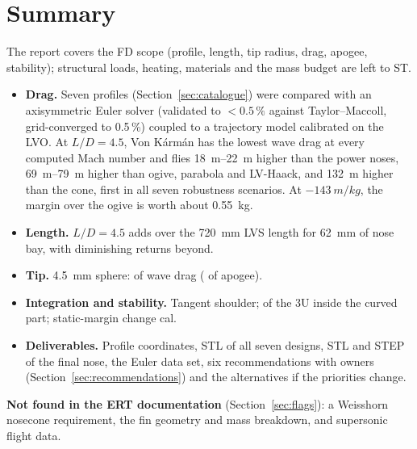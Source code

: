 \section*{Summary}

\noindent{}

\vspace{6pt}
\noindent The report covers the FD scope (profile, length, tip radius, drag, apogee, stability);
structural loads, heating, materials and the mass budget are left to ST.

\begin{itemize}[leftmargin=*,itemsep=2pt]
\item \textbf{Drag.} Seven profiles (Section~\ref{sec:catalogue}) were compared with an axisymmetric
Euler solver (validated to $<0.5\,\%$ against Taylor--Maccoll, grid-converged to 0.5\,\%) coupled to a
trajectory model calibrated on the LVO. At $L/D = 4.5$, Von K\'arm\'an has the lowest wave drag at every
computed Mach number and flies \SIrange{18}{22}{m} higher than the power noses, \SIrange{69}{79}{m}
higher than ogive, parabola and LV-Haack, and \SI{132}{m} higher than the cone, first in all seven
robustness scenarios. At $-\SI{143}{m/kg}$, the margin over the ogive is worth about \SI{0.55}{kg}.
\item \textbf{Length.} $L/D = 4.5$ adds \TRADELEN{} over the \SI{720}{mm} LVS length for \SI{62}{mm} of
nose bay, with diminishing returns beyond.
\item \textbf{Tip.} \SI{4.5}{mm} sphere: \BLUNTCOST{} of wave drag (\BLUNTAPOA{} of apogee).
\item \textbf{Integration and stability.} Tangent shoulder; \FINTHREEU{} of the 3U inside the curved
part; static-margin change \FINDSM{} cal.
\item \textbf{Deliverables.} Profile coordinates, STL of all seven designs, STL and STEP of the final
nose, the Euler data set, six recommendations with owners (Section~\ref{sec:recommendations}) and the
alternatives if the priorities change.
\end{itemize}

\noindent\textbf{Not found in the ERT documentation} (Section~\ref{sec:flags}): a Weisshorn nosecone
requirement, the fin geometry and mass breakdown, and supersonic flight data.
